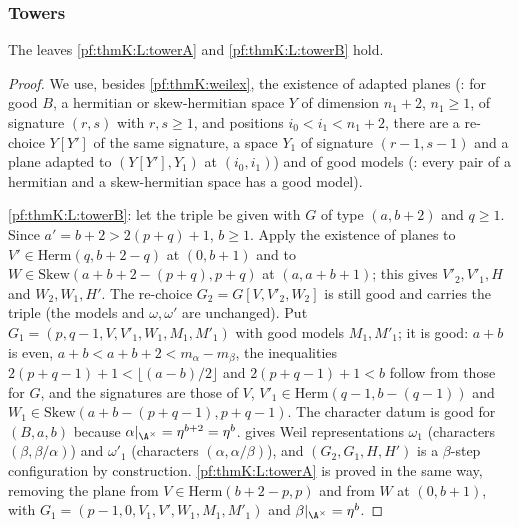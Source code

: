 \subsubsection{Towers}\label{sec:pf:thmK:towers}

\begin{proposition}[Towers]\label{pf:thmK:towers}
The leaves \ref{pf:thmK:L:towerA} and \ref{pf:thmK:L:towerB} hold.
\end{proposition}

\begin{proof}
We use, besides \cref{pf:thmK:weilex}, the existence of adapted planes (: for
good $B$, a hermitian or skew-hermitian space $Y$ of dimension $n_1+2$, $n_1\ge1$, of signature $(r,s)$ with $r,s\ge1$, and
positions $i_0<i_1<n_1+2$, there are a re-choice $Y[Y']$ of the same signature, a space $Y_1$ of signature $(r-1,s-1)$ and a
plane adapted to $(Y[Y'],Y_1)$ at $(i_0,i_1)$) and of good models (: every pair
of a hermitian and a skew-hermitian space has a good model).

\ref{pf:thmK:L:towerB}: let the triple be given with $G$ of type $(a,b+2)$ and $q\ge1$. Since $a'=b+2>2(p+q)+1$, $b\ge1$.
Apply the existence of planes to $V'\in\mathrm{Herm}(q,b+2-q)$ at $(0,b+1)$ and to $W\in\mathrm{Skew}(a+b+2-(p+q),p+q)$ at
$(a,a+b+1)$; this gives $V'_2,V'_1,H$ and $W_2,W_1,H'$. The re-choice $G_2=G[V,V'_2,W_2]$ is still good and carries the triple
(the models and $\omega,\omega'$ are unchanged). Put $G_1=(p,q-1,V,V'_1,W_1,M_1,M'_1)$ with good models $M_1,M'_1$; it is good:
$a+b$ is even, $a+b<a+b+2<m_\alpha-m_\beta$, the inequalities $2(p+q-1)+1<\lfloor(a-b)/2\rfloor$ and $2(p+q-1)+1<b$ follow from
those for $G$, and the signatures are those of $V$, $V'_1\in\mathrm{Herm}(q-1,b-(q-1))$ and
$W_1\in\mathrm{Skew}(a+b-(p+q-1),p+q-1)$. The character datum is good for $(B,a,b)$ because
$\alpha|_{\A^\times}=\eta^{b+2}=\eta^b$.  gives Weil representations $\omega_1$ (characters
$(\beta,\beta/\alpha)$) and $\omega'_1$ (characters $(\alpha,\alpha/\beta)$), and $(G_2,G_1,H,H')$ is a $\beta$-step
configuration by construction. \ref{pf:thmK:L:towerA} is proved in the same way, removing the plane from
$V\in\mathrm{Herm}(b+2-p,p)$ and from $W$ at $(0,b+1)$, with $G_1=(p-1,0,V_1,V',W_1,M_1,M'_1)$ and
$\beta|_{\A^\times}=\eta^b$.
\end{proof}


